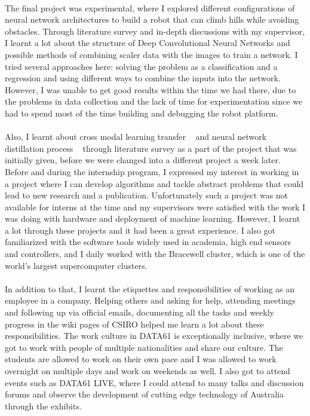 \paragraph{}
The final project was experimental, where I explored different configurations of neural network architectures to build a robot that can climb hills while avoiding obstacles. Through literature survey and in-depth discussions with my supervisor, I learnt a lot about the structure of Deep Convolutional Neural Networks and possible methods of combining scaler data with the images to train a network. I tried several approaches here: solving the problem as a classification and a regression and using different ways to combine the inputs into the network. However, I was unable to get good results within the time we had there, due to the problems in data collection and the lack of time for experimentation since we had to spend most of the time building and debugging the robot platform.

\paragraph{}
Also, I learnt about cross modal learning transfer ~\cite{cross_modal2} and neural network distillation process ~\cite{distill2} through literature survey as a part of the project that was initially given, before we were changed into a different project a week later. Before and during the internship program, I expressed my interest in working in a project where I can develop algorithms and tackle abstract problems that could lead to new research and a publication. Unfortunately such a project was not available for interns at the time and my supervisors were satisfied with the work I was doing with hardware and deployment of machine learning. However, I learnt a lot through these projects and it had been a great experience. I also got familiarized with the software tools widely used in academia, high end sensors and controllers, and I daily worked with the Bracewell cluster, which is one of the world's largest supercomputer clusters. 

\paragraph{}
In addition to that, I learnt the etiquettes and responsibilities of working as an employee in a company. Helping others and asking for help, attending meetings and following up via official emails, documenting all the tasks and weekly progress in the wiki pages of CSIRO helped me learn a lot about these responsibilities. The work culture in DATA61 is exceptionally inclusive, where we got to work with people of multiple nationalities and share our culture. The students are allowed to work on their own pace and I was allowed to work overnight on multiple days and work on weekends as well. I also got to attend events such as DATA61 LIVE, where I could attend to many talks and discussion forums and observe the development of cutting edge technology of Australia through the exhibits.

